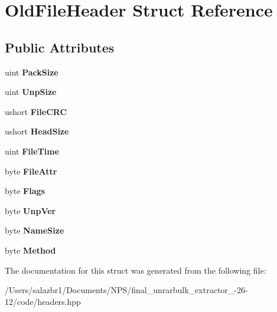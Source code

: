 \hypertarget{struct_old_file_header}{\section{Old\-File\-Header Struct Reference}
\label{struct_old_file_header}
}
\subsection*{Public Attributes}
\begin{DoxyCompactItemize}
\item 
\hypertarget{struct_old_file_header_a7b1735ad8d5e23d7925d071e6dbf38db}{uint {\bfseries Pack\-Size}}\label{struct_old_file_header_a7b1735ad8d5e23d7925d071e6dbf38db}

\item 
\hypertarget{struct_old_file_header_af4970281150a01d1a805cf7417e0e197}{uint {\bfseries Unp\-Size}}\label{struct_old_file_header_af4970281150a01d1a805cf7417e0e197}

\item 
\hypertarget{struct_old_file_header_a53837ac16c3745705f8dd58c06b02a80}{ushort {\bfseries File\-C\-R\-C}}\label{struct_old_file_header_a53837ac16c3745705f8dd58c06b02a80}

\item 
\hypertarget{struct_old_file_header_a80e51a5f91d58c143bba8d1c1bf757aa}{ushort {\bfseries Head\-Size}}\label{struct_old_file_header_a80e51a5f91d58c143bba8d1c1bf757aa}

\item 
\hypertarget{struct_old_file_header_aa9bba2bc62e140533da8f99aac194e21}{uint {\bfseries File\-Time}}\label{struct_old_file_header_aa9bba2bc62e140533da8f99aac194e21}

\item 
\hypertarget{struct_old_file_header_a1418f4ae642623910e4f387e1847af91}{byte {\bfseries File\-Attr}}\label{struct_old_file_header_a1418f4ae642623910e4f387e1847af91}

\item 
\hypertarget{struct_old_file_header_a49213b0b149475b674539aaeaece088b}{byte {\bfseries Flags}}\label{struct_old_file_header_a49213b0b149475b674539aaeaece088b}

\item 
\hypertarget{struct_old_file_header_ae08e7e3407437e6539cf9602bc2a87c4}{byte {\bfseries Unp\-Ver}}\label{struct_old_file_header_ae08e7e3407437e6539cf9602bc2a87c4}

\item 
\hypertarget{struct_old_file_header_ac18d5ecb73221a0edd7e74f7867a289c}{byte {\bfseries Name\-Size}}\label{struct_old_file_header_ac18d5ecb73221a0edd7e74f7867a289c}

\item 
\hypertarget{struct_old_file_header_a5195793688cf9505956a295368e2f68d}{byte {\bfseries Method}}\label{struct_old_file_header_a5195793688cf9505956a295368e2f68d}

\end{DoxyCompactItemize}


The documentation for this struct was generated from the following file\-:\begin{DoxyCompactItemize}
\item 
/\-Users/salazbr1/\-Documents/\-N\-P\-S/final\-\_\-unrarbulk\-\_\-extractor\-\_-\/26-\/12/code/headers.\-hpp\end{DoxyCompactItemize}
